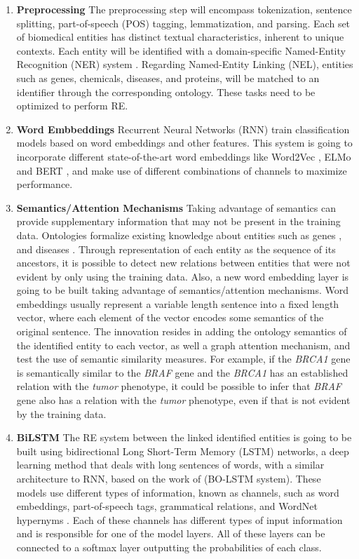 \begin{enumerate}
    \item  \textbf{Preprocessing} The preprocessing step will encompass tokenization, sentence splitting, part-of-speech (POS) tagging, lemmatization, and parsing. Each set of biomedical entities has distinct textual characteristics, inherent to unique contexts. Each entity will be identified with a domain-specific Named-Entity Recognition (NER) system \citep{yadav2019survey}. Regarding Named-Entity Linking (NEL), entities such as genes, chemicals, diseases, and proteins, will be matched to an identifier through the corresponding ontology. These tasks need to be optimized to perform RE.   
    \item \textbf{Word Embbeddings} Recurrent Neural Networks (RNN) train classification models based on word embeddings and other features. This system is going to incorporate different state-of-the-art word embeddings like Word2Vec \citep{li2017neural}, ELMo \citep{peters2018deep} and BERT \citep{lin2016neural}, and make use of different combinations of channels to maximize performance.
    \item \textbf{Semantics/Attention Mechanisms} Taking advantage of semantics can provide supplementary information that may not be present in the training data. Ontologies formalize existing knowledge about entities such as genes \citep{ashburner2000gene}, and diseases \citep{schriml2012disease}. Through representation of each entity as the sequence of its ancestors, it is possible to detect new relations between entities that were not evident by only using the training data. Also, a new word embedding layer is going to be built taking advantage of semantics/attention mechanisms. Word embeddings usually represent a variable length sentence into a fixed length vector, where each element of the vector encodes some semantics of the original sentence. The innovation resides in adding the ontology semantics of the identified entity to each vector, as well a graph attention mechanism, and test the use of semantic similarity measures. For example, if the \textit{BRCA1} gene is semantically similar to the \textit{BRAF} gene and the \textit{BRCA1} has an established relation with the \textit{tumor} phenotype, it could be possible to infer that \textit{BRAF} gene also has a relation with the \textit{tumor} phenotype, even if that is not evident by the training data.
    \item \textbf{BiLSTM} The RE system between the linked identified entities is going to be built using bidirectional Long Short-Term Memory (LSTM) networks, a deep learning method that deals with long sentences of words, with a similar architecture to RNN, based on the work of \cite{lamurias2019bo} (BO-LSTM system). These models use different types of information, known as channels, such as word embeddings, part-of-speech tags, grammatical relations, and WordNet hypernyms \citep{ciaramita2006broad}. Each of these channels has different types of input information and is responsible for one of the model layers. All of these layers can be connected to a softmax layer outputting the probabilities of each class. 
\end{enumerate}


